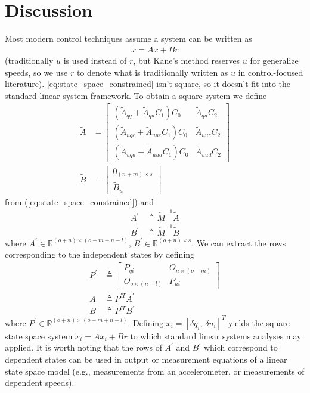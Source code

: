 \section{Discussion}
\label{sec:discussion}
Most modern control techniques assume a system can be written as
\begin{align}
\dot{x} = Ax + Br
\end{align}
(traditionally $u$ is used instead of $r$, but Kane's method reserves $u$ for
generalize speeds, so we use $r$ to denote what is traditionally written as $u$
in control-focused literature). \autoref{eq:state_space_constrained} isn't
square, so it doesn't fit into the standard linear system framework. To obtain
a square system we define
\begin{align}
\tilde{A} &=
   \left[
     \begin{array}{cc}
       (\tilde{A}_{qq} + \tilde{A}_{qu} C_1 ) C_0 & \tilde{A}_{qu} C_2 \\
       (\tilde{A}_{uqc} + \tilde{A}_{uuc} C_1 ) C_0 & \tilde{A}_{uuc} C_2\\
       (\tilde{A}_{uqd} + \tilde{A}_{uud} C_1 ) C_0 & \tilde{A}_{uud} C_2
     \end{array}
   \right]\\
\tilde{B} &= 
    \left[
      \begin{array}{c}
        0_{(n+m) \times s} \\
        \tilde{B}_{u}
      \end{array}
    \right]
\end{align}
from (\ref{eq:state_space_constrained}) and
\begin{align}
  \label{eq:A_prime}
    A^\prime &\triangleq \tilde{M}^{-1} \tilde{A} \\
  \label{eq:B_prime}
    B^\prime &\triangleq \tilde{M}^{-1} \tilde{B}
\end{align}
where  $A^\prime \in \mathbb{R}^{(o + n) \times (o - m + n -l)}$, $B^\prime \in
\mathbb{R}^{(o + n) \times s}$.  We can extract the rows corresponding to the
independent states by defining
\begin{align}
  \label{eq:P_prime}
    P^\prime &\triangleq \begin{bmatrix}
        P_{qi} & O_{n \times (o - m)} \\
        O_{o \times (n - l)} & P_{ui}
    \end{bmatrix} \\
  \label{eq:A}
    A &\triangleq P^{\prime T} A^\prime \\
  \label{eq:B}
    B &\triangleq P^{\prime T} B^\prime
\end{align}
where $P^\prime \in \mathbb{R}^{(o + n) \times (o - m + n - l)}$.  Defining
$x_i = \left[\delta q_i,\,\delta u_i\right]^{T}$ yields the square state space
system $\dot{x}_i = A x_i + B r$ to which standard linear systems analyses may
applied. It is worth noting that the rows of $A^\prime$ and $B^\prime$ which
correspond to dependent states can be used in output or measurement equations
of a linear state space model (e.g., measurements from an accelerometer, or
measurements of dependent speeds).

